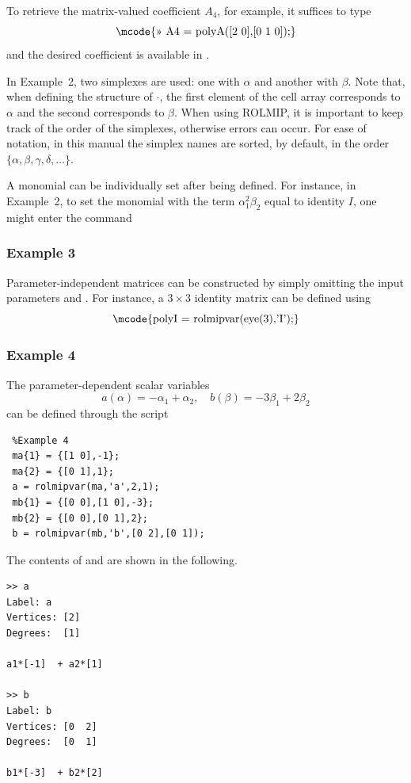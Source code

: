 \documentclass[english,11pt]{article}
\newcommand\vi{\vspace{.5cm}}
\theoremstyle{break} \theorembodyfont{\small\rm}
\begin{document}
\vi

To retrieve the matrix-valued coefficient $A_4$, for example, it suffices to type
\[
\mbox{\mcode{>> A4 = polyA([2 0],[0 1 0]);}}
\]
and the desired coefficient is available in .



In Example~2, two simplexes are used: one with $\alpha$ and another with $\beta$. Note that,
when defining the structure of $\cdot$\mcode{\}}, the first element of the cell array
corresponds to $\alpha$ and the second corresponds to $\beta$. When using ROLMIP, it is important
to keep track of the order of the simplexes, otherwise errors can occur.
For ease of notation, in this manual the simplex names are sorted, by default, in the order
$\{\alpha, \beta, \gamma, \delta, \ldots\}$.


A monomial can be individually set after being defined. For instance, in Example~2,
to set the monomial with the term $\alpha_1^2\beta_2$ equal to identity $I$,
one might enter the command


\subsubsection*{Example 3}
Parameter-independent matrices can be constructed by simply omitting the input parameters 
and . For instance, a $3 \times 3$ identity matrix can be defined using
\[
\mbox{\mcode{polyI = rolmipvar(eye(3),'I');}}
\]


\subsubsection*{Example 4}
The parameter-dependent scalar variables
\[
 a(\alpha) = -\alpha_1 + \alpha_2, \quad b(\beta) = -3\beta_1 + 2\beta_2
\]
can be defined through the script

\begin{minipage}{9.5cm}
\begin{lstlisting}
 %Example 4
 ma{1} = {[1 0],-1};
 ma{2} = {[0 1],1};
 a = rolmipvar(ma,'a',2,1);
 mb{1} = {[0 0],[1 0],-3};
 mb{2} = {[0 0],[0 1],2};
 b = rolmipvar(mb,'b',[0 2],[0 1]);
\end{lstlisting}
\end{minipage}

The contents of  and  are shown in the following.

\begin{minipage}{9.0cm}
\begin{lstlisting}[rulecolor=\color{red}]
>> a
Label: a
Vertices: [2]
Degrees:  [1]

a1*[-1]  + a2*[1]

>> b
Label: b
Vertices: [0  2]
Degrees:  [0  1]

b1*[-3]  + b2*[2]
\end{lstlisting}
\end{minipage}
\end{document}
